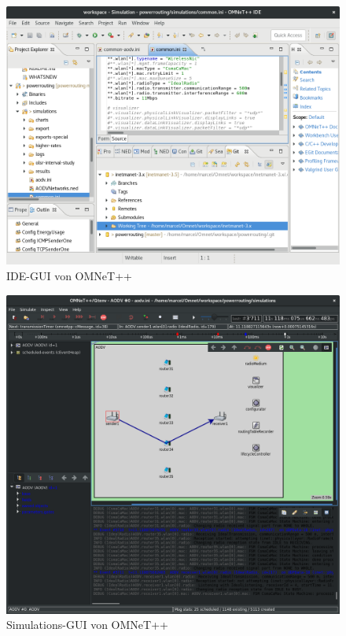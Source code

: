 \begin{figure}
  \centering
  \includegraphics[scale=0.23]{bilder/gui1.png}
  \caption{IDE-GUI von OMNeT++}
  \label{image:omnet:gui}
\end{figure}

\begin{figure}
  \centering
  \includegraphics[scale=0.213]{bilder/gui2.png}
  \caption{Simulations-GUI von OMNeT++}
  \label{image:omnet:rungui}
\end{figure}

